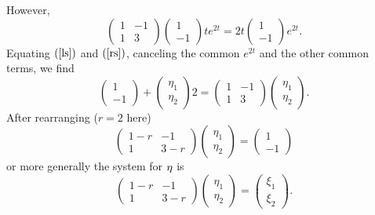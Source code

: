 \documentclass[leqno,DIV=calc,paper=a4,fontsize=11pt]{article}
\theoremstyle{definition}
\theoremstyle{plain}
\theoremstyle{remark}
\newcommand{\R}[1]{$(\ref{#1})$}
\begin{document}
However,
\[
\left(\begin{array}{rr}1&-1\\1&3\end{array}\right)
\left(\begin{array}{c}1\\-1\end{array}\right)te^{2t}
=2t\left(\begin{array}{c}1\\-1\end{array}\right)e^{2t}.
\]
Equating \R{ls} and \R{rs}, canceling the common $e^{2t}$ and the
other common terms, we find
\[
\left(\begin{array}{c}1\\-1\end{array}\right)+
\left(\begin{array}{c}\eta_1\\\eta_2\end{array}\right)2
=
\left(\begin{array}{rr}1&-1\\1&3\end{array}\right)
\left(\begin{array}{c}\eta_1\\\eta_2\end{array}\right).
\]
After rearranging ($r=2$ here)
\[
\left(\begin{array}{cc}1-r&-1\\1&3-r\end{array}\right)
\left(\begin{array}{c}\eta_1\\\eta_2\end{array}\right)
=\left(\begin{array}{c}1\\-1\end{array}\right)
\]
or more generally the system for ${\bf\eta}$ is
\begin{equation}
\left(\begin{array}{cc}1-r&-1\\1&3-r\end{array}\right)
\left(\begin{array}{c}\eta_1\\\eta_2\end{array}\right)
=\left(\begin{array}{c}\xi_1\\\xi_2\end{array}\right).
\label{etasys}
\end{equation}
\end{document}
